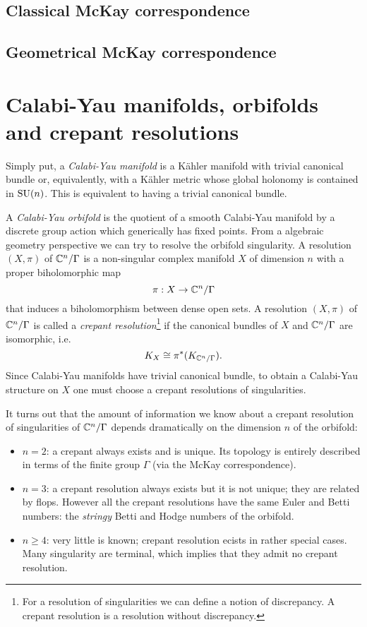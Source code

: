 \documentclass[a4paper,11pt]{article}
\begin{document}
    \subsection{Classical McKay correspondence}

    \subsection{Geometrical McKay correspondence}

\section{Calabi-Yau manifolds, orbifolds and crepant resolutions}\label{sec:CYcrepant}

    Simply put, a \emph{Calabi-Yau manifold} is a Kähler manifold with trivial canonical bundle or, equivalently, with a Kähler metric whose global holonomy is contained in $\text{SU}(n)$. This is equivalent to having a trivial canonical bundle.

    A \emph{Calabi-Yau orbifold} is the quotient of a smooth Calabi-Yau manifold by a discrete group action which generically has fixed points. From a algebraic geometry perspective we can try to resolve the orbifold singularity. A resolution $(X,\pi)$ of $\mathbb{C}^n/\Gamma$ is a non-singular complex manifold $X$ of dimension $n$ with a proper biholomorphic map 
    \begin{equation}
        \pi:X\to\mathbb{C}^n/\Gamma
    \end{equation}
    that induces a biholomorphism between dense open sets. A resolution $(X,\pi)$ of $\mathbb{C}^n/\Gamma$ is called a \emph{crepant resolution}\footnote{For a resolution of singularities we can define a notion of discrepancy. A crepant resolution is a resolution
        without discrepancy.} if the canonical bundles of $X$ and $\mathbb{C}^n/\Gamma$ are isomorphic, i.e.
        \begin{equation*}
            K_X\cong\pi^*(K_{\mathbb{C}^n/\Gamma}).
        \end{equation*}
    Since Calabi-Yau manifolds have trivial canonical bundle, to obtain a Calabi-Yau structure on $X$ one must choose a crepant resolutions of singularities.

    It turns out that the amount of information we know about a crepant resolution of singularities of $\mathbb{C}^n/\Gamma$ depends dramatically on the dimension $n$ of the orbifold:
    \begin{itemize}
        \item $n=2$: a crepant always exists and is unique. Its topology is entirely described in terms of the finite group $\Gamma$ (via the McKay correspondence).
        \item $n=3$: a crepant resolution always exists but it is not unique; they are related by flops. However all the crepant resolutions have the same Euler and Betti numbers: the \emph{stringy} Betti and Hodge numbers of the orbifold.
        \item $n\geq4$: very little is known; crepant resolution ecists in rather special cases. Many singularity are terminal, which implies that they admit no crepant resolution.
    \end{itemize}

    

\pagebreak

\listofmarker
{}

\pagebreak

\printbibliography
\end{document}

